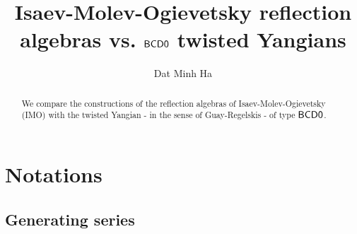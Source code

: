 

\setcounter{section}{-1}


\renewcommand{\simpleroots}{\mathbb{I}}



    \title{Isaev-Molev-Ogievetsky reflection algebras vs. $\mathsf{B}\mathsf{C}\mathsf{D}\mathsf{0}$ twisted Yangians}
    
    \author{Dat Minh Ha}
    \maketitle
    
    \begin{abstract}
        We compare the constructions of the reflection algebras of Isaev-Molev-Ogievetsky (IMO) with the twisted Yangian - in the sense of Guay-Regelskis - of type $\mathsf{B}\mathsf{C}\mathsf{D}\mathsf{0}$.
    \end{abstract}
    
    {
    \hypersetup{} 
    \tableofcontents %
    }

    \section{Notations}
        \subsection{Generating series}


